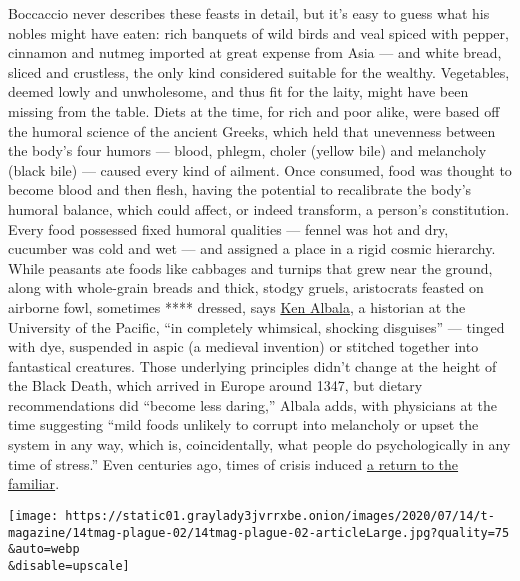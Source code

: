 Boccaccio never describes these feasts in detail, but it's easy to guess
what his nobles might have eaten: rich banquets of wild birds and veal
spiced with pepper, cinnamon and nutmeg imported at great expense from
Asia --- and white bread, sliced and crustless, the only kind considered
suitable for the wealthy. Vegetables, deemed lowly and unwholesome, and
thus fit for the laity, might have been missing from the table. Diets at
the time, for rich and poor alike, were based off the humoral science of
the ancient Greeks, which held that unevenness between the body's four
humors --- blood, phlegm, choler (yellow bile) and melancholy (black
bile) --- caused every kind of ailment. Once consumed, food was thought
to become blood and then flesh, having the potential to recalibrate the
body's humoral balance, which could affect, or indeed transform, a
person's constitution. Every food possessed fixed humoral qualities ---
fennel was hot and dry, cucumber was cold and wet --- and assigned a
place in a rigid cosmic hierarchy. While peasants ate foods like
cabbages and turnips that grew near the ground, along with whole-grain
breads and thick, stodgy gruels, aristocrats feasted on airborne fowl,
sometimes **** dressed, says
\href{https://www.pacific.edu/academics/schools-and-colleges/college-of-the-pacific/academics/departments-and-programs/history/faculty-directory/ken-albala.html}{Ken
Albala}, a historian at the University of the Pacific, ``in completely
whimsical, shocking disguises'' --- tinged with dye, suspended in aspic
(a medieval invention) or stitched together into fantastical creatures.
Those underlying principles didn't change at the height of the Black
Death, which arrived in Europe around 1347, but dietary recommendations
did ``become less daring,'' Albala adds, with physicians at the time
suggesting ``mild foods unlikely to corrupt into melancholy or upset the
system in any way, which is, coincidentally, what people do
psychologically in any time of stress.'' Even centuries ago, times of
crisis induced
\href{https://www.nytimes3xbfgragh.onion/2020/04/07/business/coronavirus-processed-foods.html}{a
return to the familiar}.

\texttt{[image: https://static01.graylady3jvrrxbe.onion/images/2020/07/14/t-magazine/14tmag-plague-02/14tmag-plague-02-articleLarge.jpg?quality=75\\\&auto=webp\\\&disable=upscale]}


